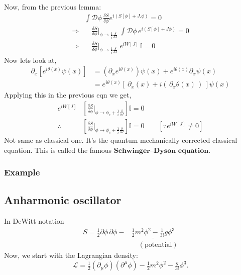 \documentclass[14pt]{article} %
\begin{document}
{Now, from the previous lemma:
\begin{align*}
&\int \mathcal{D}\phi \, \frac{\delta S}{\delta \phi} e^{i(S[\phi] + J.\phi)} = 0 \\
\Rightarrow & \quad \frac{\delta S}{\delta \phi} \bigg|_{\phi \rightarrow\frac{1}{i}\frac{\delta}{\delta J} } ~ \int \mathcal{D}\phi\, e^{i(S[\phi] + J\phi)} = 0 \\
\Rightarrow & \quad \frac{\delta S}{\delta \phi} \bigg|_{\phi \rightarrow\frac{1}{i}\frac{\delta}{\delta J} } ~ e^{iW[J]} \, \mathbb{I} = 0
\end{align*}
Now lets look at,
\begin{align*}
\partial_x \left[ e^{i\theta(x)} \psi(x) \right] &= (\partial_x e^{i\theta(x)}) \psi(x) + e^{i\theta(x)} \partial_x \psi(x) \\
&= e^{i\theta(x)} \left[ ~\partial_x(x) + i (\,\partial_x \theta(x)\,)~ \right] \psi(x)
\end{align*}
Applying this in the previous eqn we get,
\begin{align*}
e^{iW[J]} &\left[ \frac{\delta S}{\delta \phi}\bigg|_{\phi \rightarrow \phi_c + \frac{1}{i}\frac{\delta}{\delta J} }  \right] \mathbb{I} = 0 \\
\therefore &\left[ \frac{\delta S}{\delta \phi}\bigg|_{\phi \rightarrow \phi_c + \frac{1}{i}\frac{\delta}{\delta J} }  \right] \mathbb{I} = 0 \qquad [\because e^{iW[J]} \neq 0]
\end{align*}
Not same as classical one. It’s the quantum mechanically corrected classical equation. This is called the famous $\textbf{Schwinger–Dyson equation.}$

\subsubsection*{Example}
\subsection{Anharmonic oscillator} In DeWitt notation
\begin{align*}
     S = \frac{1}{2} \partial \phi \, \partial \phi - &\underline{\frac{1}{2} m^2 \phi^2 - \frac{1}{3!} g\phi^3} \\
    &\quad (\text{potential})
\end{align*}
Now, we start with the Lagrangian density:
\[
\mathcal{L} = \tfrac{1}{2} (\partial_\mu \phi)(\partial^\mu \phi) 
- \tfrac{1}{2} m^2 \phi^2 
- \tfrac{g}{3!}\phi^3.
\]

}
\end{document}

